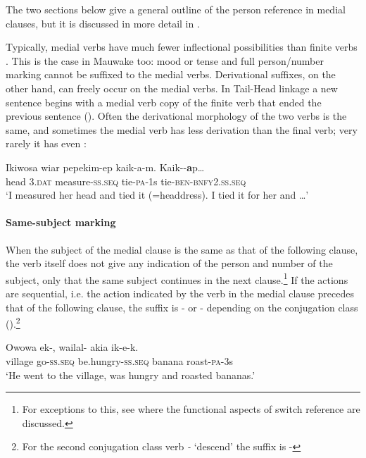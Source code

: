 The two sections below give a general outline of the person reference in medial clauses, but it is discussed in more detail in .

Typically, medial verbs have much fewer inflectional possibilities than finite verbs \citep[11]{Foley1986}. This is the case in Mauwake too: mood or tense and full person/number marking cannot be suffixed to the medial verbs. Derivational suffixes, on the other hand, can freely occur on the medial verbs. In Tail-Head linkage a new sentence begins with a medial verb copy of the finite verb that ended the previous sentence (). Often the derivational morphology of the two verbs is the same, and sometimes the medial verb has less derivation than the final verb; very rarely it has even  :

\ea%
\label{ex:3:x237}
\gll Ikiwosa wiar pepekim-ep kaik-a-m. Kaik--\textbf{a}p{\dots} \\
head 3.\textsc{dat} measure-\textsc{ss}.\textsc{seq} tie-\textsc{pa}-1s tie-\textsc{ben}-\textsc{bnfy}2.\textsc{ss}.\textsc{seq}\\
\glt`I measured her head and tied it (=headdress). I tied it for her and {\dots}'
\z

\paragraph{Same-subject marking}\label{sec:3.8.3.5.1}
{}
When the subject of the medial clause is the same as that of the following clause, the verb itself does not give any indication of the person and number of the subject, only that the same subject continues in the next clause.\footnote{For exceptions to this, see  where the functional aspects of switch reference are discussed.} If the actions are sequential, i.e. the action indicated by the verb in the medial clause precedes that of the following clause, the suffix is \nobreakdash- or \nobreakdash-  depending on the conjugation class ().\footnote{For the second conjugation class verb \textit{-} `descend' the suffix is -} 

\ea%
\label{ex:3:x238}
\gll Owowa ek-, wailal- akia ik-e-k. \\
village go-\textsc{ss}.\textsc{seq} be.hungry-\textsc{ss}.\textsc{seq} banana roast-\textsc{pa}-3s \\
\glt`He went to the village, was hungry and roasted bananas.' 
\z


